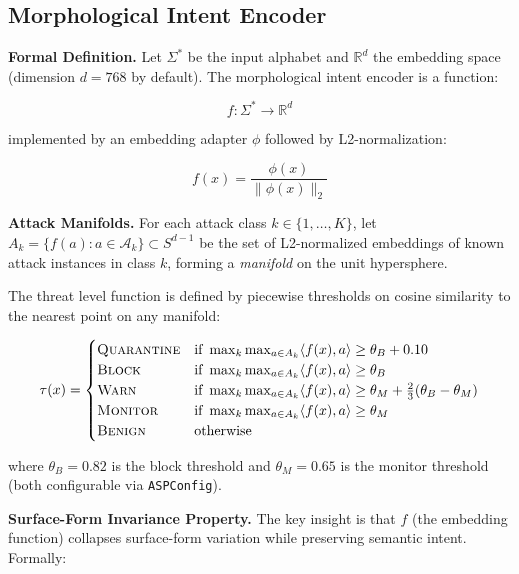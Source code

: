 \documentclass[sigconf,natbib=false]{acmart}
\begin{document}
\subsection{Morphological Intent Encoder}
\label{sec:encoder}

\textbf{Formal Definition.}
Let $\Sigma^*$ be the input alphabet and $\mathbb{R}^d$ the embedding space
(dimension $d = 768$ by default). The morphological intent encoder is a
function:

\begin{equation}
\label{eq:encoder}
f : \Sigma^* \to \mathbb{R}^d
\end{equation}

implemented by an embedding adapter $\phi$ followed by L2-normalization:

\begin{equation}
\label{eq:embed}
f(x) = \frac{\phi(x)}{\|\phi(x)\|_2}
\end{equation}

\textbf{Attack Manifolds.}
For each attack class $k \in \{1, \ldots, K\}$, let
$A_k = \{f(a) : a \in \mathcal{A}_k\} \subset S^{d-1}$
be the set of L2-normalized embeddings of known attack instances in class $k$,
forming a \emph{manifold} on the unit hypersphere.

The threat level function is defined by piecewise thresholds on cosine
similarity to the nearest point on any manifold:

\begin{equation}
\label{eq:threat}
\tau(x) = \begin{cases}
\textsc{Quarantine} & \text{if } \max_k \max_{a \in A_k} \langle f(x), a \rangle \geq \theta_B + 0.10 \\
\textsc{Block}      & \text{if } \max_k \max_{a \in A_k} \langle f(x), a \rangle \geq \theta_B \\
\textsc{Warn}       & \text{if } \max_k \max_{a \in A_k} \langle f(x), a \rangle \geq \theta_M + \tfrac{2}{3}(\theta_B - \theta_M) \\
\textsc{Monitor}    & \text{if } \max_k \max_{a \in A_k} \langle f(x), a \rangle \geq \theta_M \\
\textsc{Benign}     & \text{otherwise}
\end{cases}
\end{equation}

where $\theta_B = 0.82$ is the block threshold and $\theta_M = 0.65$
is the monitor threshold (both configurable via \texttt{ASPConfig}).

\textbf{Surface-Form Invariance Property.}
The key insight is that $f$ (the embedding function) collapses
surface-form variation while preserving semantic intent. Formally:
\end{document}
